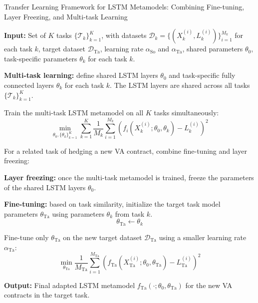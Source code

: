 \begin{algorithm}
    \caption{Transfer Learning Framework for LSTM Metamodels: Combining Fine-tuning, Layer Freezing, and Multi-task Learning}
    \begin{algorithmic}[1] \label{alg3:combined}
        \STATE \textbf{Input:} Set of $K$ tasks $\{\mathcal{T}_k\}_{k=1}^K$, with datasets $\mathcal{D}_k = \{(X_k^{(i)}, L_k^{(i)})\}_{i=1}^{M_k}$ for each task $k$, target dataset $\mathcal{D}_{\text{Ta}}$, learning rate $\alpha_{\text{So}}$ and $\alpha_{\text{Ta}}$, shared parameters $\theta_0$, task-specific parameters $\theta_k$ for each task $k$.
        
        \STATE \textbf{Multi-task learning:} define shared LSTM layers $\theta_0$ and task-specific fully connected layers $\theta_k$ for each task $k$. The LSTM layers are shared across all tasks $\{\mathcal{T}_k\}_{k=1}^K$.
        
        \STATE Train the multi-task LSTM metamodel on all $K$ tasks simultaneously:
        \begin{equation}
            \min_{\theta_0, \{\theta_k\}_{k=1}^K} \sum_{k=1}^K \frac{1}{M_k} \sum_{i=1}^{M_k} \left( f_i(X_k^{(i)}; \theta_0, \theta_k) - L_k^{(i)} \right)^2
        \end{equation}
        
        \STATE For a related task of hedging a new VA contract, combine fine-tuning and layer freezing:

        \STATE \textbf{Layer freezing:} once the multi-task metamodel is trained, freeze the parameters of the shared LSTM layers $\theta_0$.
        
        \STATE \textbf{Fine-tuning:}  based on task similarity, initialize the target task model parameters $\theta_{\text{Ta}}$ using parameters $\theta_k$ from task $k$.
        \[
        \theta_{\text{Ta}} \gets \theta_k 
        \]
        
        \STATE Fine-tune only $\theta_{\text{Ta}}$ on the new target dataset $\mathcal{D}_{\text{Ta}}$ using a smaller learning rate $\alpha_{\text{Ta}}$:
        \begin{equation}
            \min_{\theta_{\text{Ta}}} \frac{1}{M_{\text{Ta}}} \sum_{i=1}^{M_{\text{Ta}}} \left( f_{\text{Ta}}(X_{\text{Ta}}^{(i)}; \theta_0, \theta_{\text{Ta}}) - L_{\text{Ta}}^{(i)} \right)^2
        \end{equation}
        
        \STATE \textbf{Output:} Final adapted LSTM metamodel $f_{\text{Ta}}(\cdot; \theta_0, \theta_{\text{Ta}})$ for the new VA contracts in the target task.
    \end{algorithmic}
    \end{algorithm}

